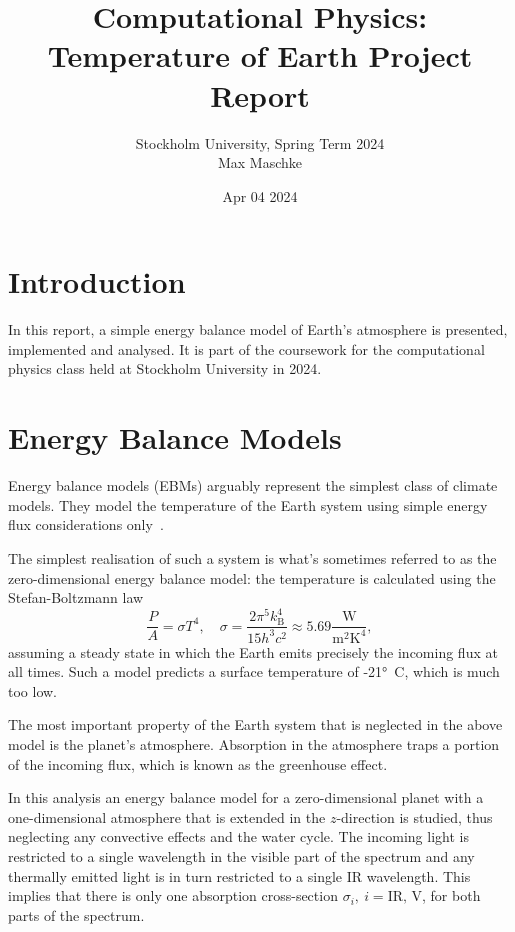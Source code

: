 \documentclass[a4paper,DIV=12,english]{scrartcl}
\title{Computational Physics: Temperature of Earth Project Report}
\author{Stockholm University, Spring Term 2024 \\Max Maschke}
\date{Apr 04 2024}
\begin{document}
\maketitle


\tableofcontents
\newpage


\newpage
\section{Introduction}
In this report, a simple energy balance model of Earth's atmosphere is presented, implemented and analysed. It is part of the coursework for the computational physics class held at Stockholm University in 2024.

\section{Energy Balance Models}
Energy balance models (EBMs) arguably represent the simplest class of climate models. They model the temperature of the Earth system using simple energy flux considerations only~\cite{ebcms}. 

The simplest realisation of such a system is what's sometimes referred to as the zero-dimensional energy balance model: the temperature is calculated using the Stefan-Boltzmann law
\begin{equation}
    \frac{P}{A} = \sigma T^4,\quad \sigma = \frac{2\pi^5 k_\text{B}^4}{15 h^3c^2}\approx 5.69 \frac{\text{W}}{\text{m}^2\text{K}^4},
\end{equation}
assuming a steady state in which the Earth emits precisely the incoming flux at all times. Such a model predicts a surface temperature of -21°~C, which is much too low.

The most important property of the Earth system that is neglected in the above model is the planet's atmosphere. Absorption in the atmosphere traps a portion of the incoming flux, which is known as the greenhouse effect.

In this analysis an energy balance model for a zero-dimensional planet with a one-dimensional atmosphere that is extended in the $z$-direction is studied, thus neglecting any convective effects and the water cycle. The incoming light is restricted to a single wavelength in the visible part of the spectrum and any thermally emitted light is in turn restricted to a single IR wavelength. This implies that there is only one absorption cross-section $\sigma_i,~i=\text{IR, V}$, for both parts of the spectrum.
\end{document}

